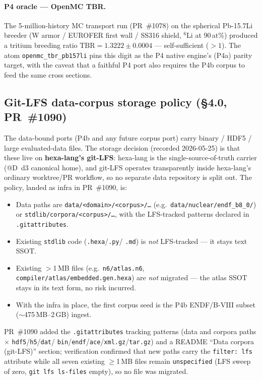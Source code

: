 \paragraph{P4 oracle --- OpenMC TBR.} The 5-million-history MC transport
run (PR~\#1078) on the spherical Pb-15.7Li breeder (W armor / EUROFER
first wall / SS316 shield, $^6$Li at 90\,at\%) produced a tritium
breeding ratio $\text{TBR}=1.3222\pm0.0004$ --- self-sufficient
($>1$). The atom \verb|openmc_tbr_pb157li| pins this digit as the P4
native engine's (P4a) parity target, with the caveat that a faithful
P4 port also requires the P4b corpus to feed the same cross sections.

\subsection{Git-LFS data-corpus storage policy (\S4.0, PR~\#1090)}
\label{app:hexaport:lfs}

The data-bound ports (P4b and any future corpus port) carry binary /
HDF5 / large evaluated-data files. The storage decision (recorded
2026-05-25) is that these live on \textbf{hexa-lang's git-LFS}: hexa-lang
is the single-source-of-truth carrier (@D~d3 canonical home), and
git-LFS operates transparently inside hexa-lang's ordinary
worktree/PR workflow, so no separate data repository is split out. The
policy, landed as infra in PR~\#1090, is:
\begin{itemize}\itemsep0.2em
\item Data paths are \texttt{data/<domain>/<corpus>/\dots} (e.g.\
\texttt{data/nuclear/endf\_b8\_0/}) or
\texttt{stdlib/corpora/<corpus>/\dots}, with the LFS-tracked patterns
declared in \texttt{.gitattributes}.
\item Existing \texttt{stdlib} code (\texttt{.hexa}/\texttt{.py}/%
\texttt{.md}) is \emph{not} LFS-tracked --- it stays text SSOT.
\item Existing $>$1\,MB files (e.g.\ \texttt{n6/atlas.n6},
\texttt{compiler/atlas/embedded.gen.hexa}) are \emph{not} migrated ---
the atlas SSOT stays in its text form, no risk incurred.
\item With the infra in place, the first corpus seed is the
P4b ENDF/B-VIII subset ($\sim$475\,MB--2\,GB) ingest.
\end{itemize}
PR~\#1090 added the \texttt{.gitattributes} tracking patterns (data
and corpora paths $\times$ \texttt{hdf5}/\texttt{h5}/\texttt{dat}/%
\texttt{bin}/\texttt{endf}/\texttt{ace}/\texttt{xml.gz}/\texttt{tar.gz})
and a README ``Data corpora (git-LFS)'' section; verification confirmed
that new paths carry the \texttt{filter: lfs} attribute while all seven
existing $\geq$1\,MB files remain \texttt{unspecified} (LFS sweep of
zero, \texttt{git lfs ls-files} empty), so no file was migrated.

